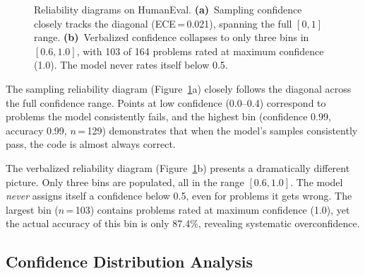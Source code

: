 \documentclass{article}
\begin{document}
\begin{figure}[t]
\caption{Reliability diagrams on HumanEval. \textbf{(a)}~Sampling confidence closely tracks the diagonal (ECE\,=\,0.021), spanning the full $[0,1]$ range. \textbf{(b)}~Verbalized confidence collapses to only three bins in $[0.6, 1.0]$, with 103 of 164 problems rated at maximum confidence (1.0). The model never rates itself below 0.5.}
\label{fig:reliability}
\end{figure}

The sampling reliability diagram (Figure~\ref{fig:reliability}a) closely follows the diagonal across the full confidence range. Points at low confidence (0.0--0.4) correspond to problems the model consistently fails, and the highest bin (confidence 0.99, accuracy 0.99, $n$\,=\,129) demonstrates that when the model's samples consistently pass, the code is almost always correct.

The verbalized reliability diagram (Figure~\ref{fig:reliability}b) presents a dramatically different picture. Only three bins are populated, all in the range $[0.6, 1.0]$. The model \emph{never} assigns itself a confidence below 0.5, even for problems it gets wrong. The largest bin ($n$\,=\,103) contains problems rated at maximum confidence (1.0), yet the actual accuracy of this bin is only 87.4\%, revealing systematic overconfidence.

\subsection{Confidence Distribution Analysis}
\end{document}
